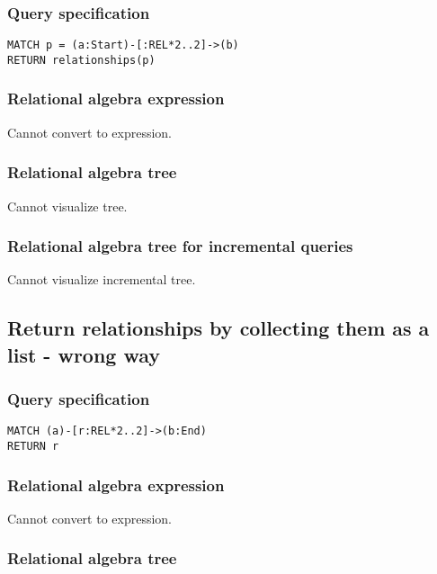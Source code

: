 \subsubsection*{Query specification}

\begin{lstlisting}
MATCH p = (a:Start)-[:REL*2..2]->(b)
RETURN relationships(p)
\end{lstlisting}

\subsubsection*{Relational algebra expression}

Cannot convert to expression.

\subsubsection*{Relational algebra tree}

Cannot visualize tree.

\subsubsection*{Relational algebra tree for incremental queries}

Cannot visualize incremental tree.

\subsection{Return relationships by collecting them as a list - wrong way}

\subsubsection*{Query specification}

\begin{lstlisting}
MATCH (a)-[r:REL*2..2]->(b:End)
RETURN r
\end{lstlisting}

\subsubsection*{Relational algebra expression}

Cannot convert to expression.

\subsubsection*{Relational algebra tree}

